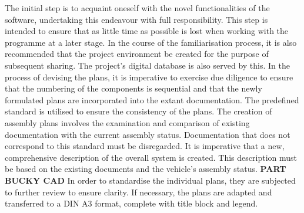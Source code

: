 The initial step is to acquaint oneself with the novel functionalities of the software, undertaking this endeavour with full responsibility. This step is intended to ensure that as little time as possible is lost when working with the programme at a later stage. In the course of the familiarisation process, it is also recommended that the project environment be created for the purpose of subsequent sharing. The project's digital database is also served by this. \newline
In the process of devising the plans, it is imperative to exercise due diligence to ensure that the numbering of the components is sequential and that the newly formulated plans are incorporated into the extant documentation. The predefined standard is utilised to ensure the consistency of the plans.\newline
The creation of assembly plans involves the examination and comparison of existing documentation with the current assembly status. Documentation that does not correspond to this standard must be disregarded. It is imperative that a new, comprehensive description of the overall system is created. This description must be based on the existing documents and the vehicle's assembly status.\newline
\textbf{PART BUCKY CAD}
\newline
In order to standardise the individual plans, they are subjected to further review to ensure clarity. If necessary, the plans are adapted and transferred to a DIN A3 format, complete with title block and legend.

